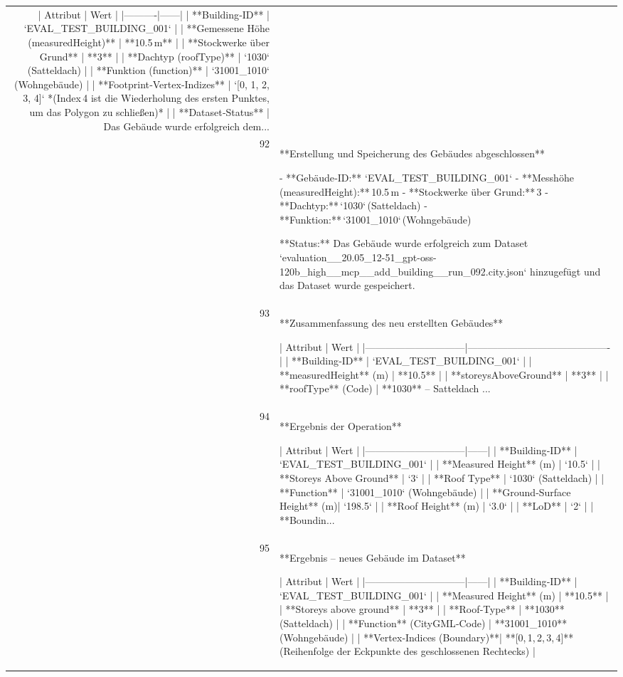 \documentclass[a4paper,11pt]{article}
\begin{document}
\begin{table}[ht]
\begin{tabular}{r p{12cm}}
| Attribut | Wert |
|----------|------|
| **Building‑ID** | `EVAL\_TEST\_BUILDING\_001` |
| **Gemessene Höhe (measuredHeight)** | **10.5 m** |
| **Stockwerke über Grund** | **3** |
| **Dachtyp (roofType)** | `1030` (Satteldach) |
| **Funktion (function)** | `31001\_1010` (Wohngebäude) |
| **Footprint‑Vertex‑Indizes** | `[0, 1, 2, 3, 4]`  *(Index 4 ist die Wiederholung des ersten Punktes, um das Polygon zu schließen)* |
| **Dataset‑Status** | Das Gebäude wurde erfolgreich dem... \\
92 & **Erstellung und Speicherung des Gebäudes abgeschlossen**

- **Gebäude‑ID:** `EVAL\_TEST\_BUILDING\_001`  
- **Messhöhe (measuredHeight):** 10.5 m  
- **Stockwerke über Grund:** 3  
- **Dachtyp:** `1030` (Satteldach)  
- **Funktion:** `31001\_1010` (Wohngebäude)  

**Status:** Das Gebäude wurde erfolgreich zum Dataset `evaluation\_\_20.05\_12-51\_gpt-oss-120b\_high\_\_mcp\_\_add\_building\_\_run\_092.city.json` hinzugefügt und das Dataset wurde gespeichert. \\
93 & **Zusammenfassung des neu erstellten Gebäudes**

| Attribut                     | Wert                                      |
|------------------------------|-------------------------------------------|
| **Building‑ID**              | `EVAL\_TEST\_BUILDING\_001`                  |
| **measuredHeight** (m)       | **10.5**                                   |
| **storeysAboveGround**       | **3**                                      |
| **roofType** (Code)          | **1030** – Satteldach          ... \\
94 & **Ergebnis der Operation**

| Attribut                     | Wert |
|------------------------------|------|
| **Building‑ID**              | `EVAL\_TEST\_BUILDING\_001` |
| **Measured Height** (m)      | `10.5` |
| **Storeys Above Ground**     | `3` |
| **Roof Type**                | `1030` (Satteldach) |
| **Function**                 | `31001\_1010` (Wohngebäude) |
| **Ground‑Surface Height** (m)| `198.5` |
| **Roof Height** (m)          | `3.0` |
| **LoD**                      | `2` |
| **Boundin... \\
95 & **Ergebnis – neues Gebäude im Dataset**

| Attribut                     | Wert |
|------------------------------|------|
| **Building‑ID**              | `EVAL\_TEST\_BUILDING\_001` |
| **Measured Height** (m)      | **10.5** |
| **Storeys above ground**     | **3** |
| **Roof‑Type**                | **1030** (Satteldach) |
| **Function** (CityGML‑Code) | **31001\_1010** (Wohngebäude) |
| **Vertex‑Indices (Boundary)**| **[0, 1, 2, 3, 4]** (Reihenfolge der Eckpunkte des geschlossenen Rechtecks) |


\end{tabular}
\end{table}
\end{document}
